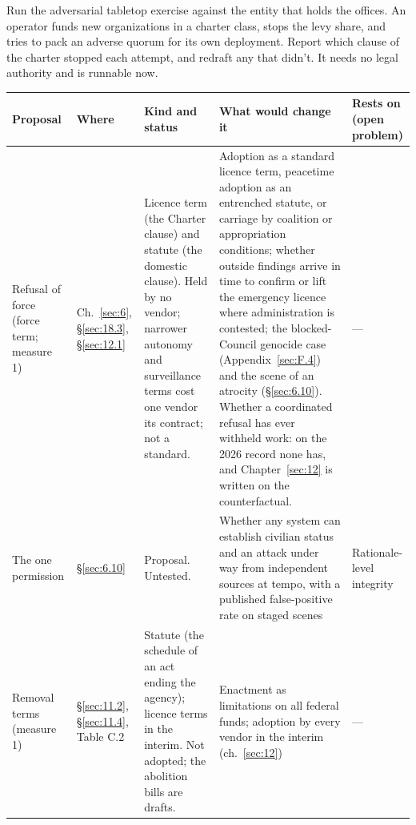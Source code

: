 
Run the adversarial tabletop exercise against the entity that holds the offices. An operator funds new organizations in a charter class, stops the levy share, and tries to pack an adverse quorum for its own deployment. Report which clause of the charter stopped each attempt, and redraft any that didn't. It needs no legal authority and is runnable now.


\begingroup\small\renewcommand{\arraystretch}{1.12}
\begin{longtable}{@{}>{\raggedright\arraybackslash}p{}>{\raggedright\arraybackslash}p{}>{\raggedright\arraybackslash}p{}>{\raggedright\arraybackslash}p{}>{\raggedright\arraybackslash}p{}@{}}
\hline
\textbf{Proposal} & \textbf{Where} & \textbf{Kind and status} & \textbf{What would change it} & \textbf{Rests on (open problem)} \\
\hline
\endhead
Refusal of force (force term; measure 1) & Ch.~\ref{sec:6}, \S\ref{sec:18.3}, \S\ref{sec:12.1} & Licence term (the Charter clause) and statute (the domestic clause). Held by no vendor; narrower autonomy and surveillance terms cost one vendor its contract; not a standard. & Adoption as a standard licence term, peacetime adoption as an entrenched statute, or carriage by coalition or appropriation conditions; whether outside findings arrive in time to confirm or lift the emergency licence where administration is contested; the blocked-Council genocide case (Appendix~\ref{sec:F.4}) and the scene of an atrocity (\S\ref{sec:6.10}). Whether a coordinated refusal has ever withheld work: on the 2026 record none has, and Chapter~\ref{sec:12} is written on the counterfactual. & — \\ \hline
The one permission & \S\ref{sec:6.10} & Proposal. Untested. & Whether any system can establish civilian status and an attack under way from independent sources at tempo, with a published false-positive rate on staged scenes & Rationale-level integrity \\ \hline
Removal terms (measure 1) & \S\ref{sec:11.2}, \S\ref{sec:11.4}, Table C.2 & Statute (the schedule of an act ending the agency); licence terms in the interim. Not adopted; the abolition bills are drafts. & Enactment as limitations on all federal funds; adoption by every vendor in the interim (ch.~\ref{sec:12}) & — \\ \hline

\end{longtable}
